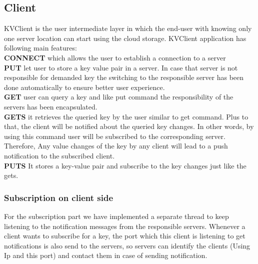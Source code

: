 \documentclass{sig-alternate}
\begin{document}
\subsection{Client}
KVClient is the user intermediate layer in which the end-user with knowing only one server location can start using the cloud storage. KVClient application has following main features: \\
\textbf{CONNECT} which allows the user to establish a connection to a server\\
\textbf{PUT} let user to store a key value pair in a server. In case that server is not responsible for demanded key the switching to the responsible server has been done automatically to ensure better user experience.\\
\textbf{GET} user can query a key and like put command the responsibility of the servers has been encapsulated.\\
\textbf{GETS} it retrieves the queried key by the user similar to get command. Plus to that, the client will be notified about the queried  key changes. In other words, by using this command user will be subscribed to the corresponding server. Therefore, Any value changes of the key by any client will lead to a push notification to the subscribed client.\\
\textbf{PUTS} It stores a key-value pair and subscribe to the key changes just like the gets.\\
\subsubsection{Subscription on client side}
For the subscription part we have implemented a separate thread to keep listening to the notification messages from the responsible servers. Whenever a client wants to subscribe for a key, the port which this client is listening to get notifications is also send to the servers, so servers can identify the clients (Using Ip and this port) and contact them in case of sending notification. %
\end{document}
